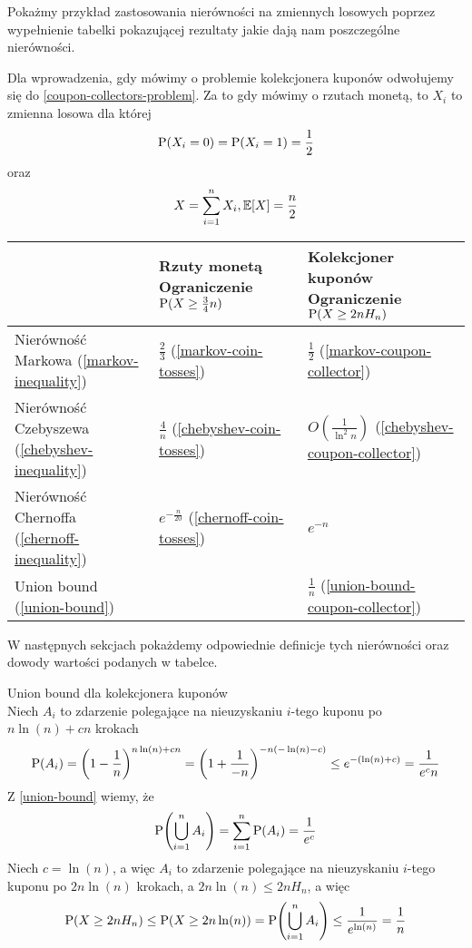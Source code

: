 Pokażmy przykład zastosowania nierówności na zmiennych losowych poprzez wypełnienie tabelki pokazującej rezultaty jakie dają nam poszczególne nierówności.

Dla wprowadzenia, gdy mówimy o problemie kolekcjonera kuponów odwołujemy się do \ref{coupon-collectors-problem}. Za to gdy mówimy o rzutach monetą, to \(X_i\) to zmienna losowa dla której 
\[
	\operatorname{P}(X_i = 0) = \operatorname{P}(X_i = 1) = \frac{1}{2}
\]
oraz
\[
	X = \sum_{i=1}^n X_i, \ev{X} = \frac{n}{2}
\]

\begin{tabular}{p{6cm} p{5.5cm} p{5.5cm}}
\toprule
 & Rzuty monetą \newline Ograniczenie \(\operatorname{P}(X \geq \frac{3}{4}n)\)  & Kolekcjoner kuponów \newline Ograniczenie \(\operatorname{P}(X \geq 2 n H_n)\)\\
\midrule
Nierówność Markowa (\ref{markov-inequality}) & \(\frac{2}{3}\) (\ref{markov-coin-tosses}) & \(\frac{1}{2}\) (\ref{markov-coupon-collector}) \\

Nierówność Czebyszewa (\ref{chebyshev-inequality}) & \(\frac{4}{n}\) (\ref{chebyshev-coin-tosses}) & \(O(\frac{1}{\ln^2 n})\) (\ref{chebyshev-coupon-collector})\\

Nierówność Chernoffa (\ref{chernoff-inequality}) & \(e^{-\frac{n}{20}}\) (\ref{chernoff-coin-tosses})& \(e^{-n}\) \\

Union bound (\ref{union-bound}) & \(\) & \(\frac{1}{n}\) (\ref{union-bound-coupon-collector}) \\
\bottomrule
\end{tabular}

W następnych sekcjach pokażdemy odpowiednie definicje tych nierówności oraz dowody wartości podanych w tabelce.

\begin{example} Union bound dla kolekcjonera kuponów\\
	\label{union-bound-coupon-collector}
	Niech \(A_i\) to zdarzenie polegające na nieuzyskaniu \(i\)-tego kuponu po \(n \ln(n) + cn\) krokach
	\[
		\prob\pars{A_i} = \pars{1 - \frac{1}{n}}^{n \ln(n) + cn} = \pars{1 + \frac{1}{-n}}^{-n(-\ln(n) -c)} \leq e^{-(\ln(n) + c)} = \frac{1}{e^c n}
	\]
	Z \ref{union-bound} wiemy, że
	\[
		\prob\pars{\bigcup_{i=1}^n A_i} = \sum_{i=1}^n \prob\pars{A_i} = \frac{1}{e^c}
	\]
	Niech \(c = \ln(n)\), a więc \(A_i\) to zdarzenie polegające na nieuzyskaniu \(i\)-tego kuponu po \(2n \ln(n)\) krokach, a \(2n \ln(n) \leq 2n H_n\), a więc
	\[
		\prob(X \geq 2n H_n) \leq \prob\pars{X \geq 2n \ln(n)} = \prob\pars{\bigcup_{i=1}^n A_i} \leq \frac{1}{e^{\ln(n)}} = \frac{1}{n}
	\]
\end{example}